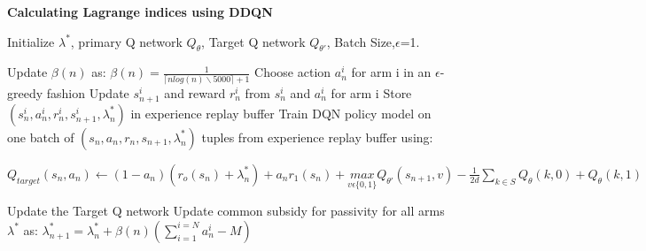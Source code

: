 \documentclass{slides}
\begin{document}
{\newpage
\textbf{Calculating Lagrange indices using DDQN}
\begin{algorithm}[H]
\begin{small}
\begin{algorithmic}[1]
    \State Initialize $\lambda^*$, primary Q network $Q_\theta$, Target Q network $Q_{\theta'}$, Batch Size,$\epsilon$=1.

        
        \State Update $\beta(n)$ as:
        $\beta(n)=\frac{1}{\lceil{nlog(n)\backslash5000}\rceil+1}$
            \State Choose action $a_{n}^i$ for  arm i in an $\epsilon$-greedy fashion
            \State Update $s_{n+1}^i$ and reward $r_n^i$ from $s_{n}^i$ and $a_{n}^i$ for  arm i
            \State Store $(s_{n}^i,a_{n}^i,r_{n}^i,s_{n+1}^i,\lambda_n^*)$ in experience replay buffer
            \State Train DQN policy model on one batch of $(s_{n},a_{n},r_{n},s_{n+1},\lambda_n^*)$ tuples from experience replay buffer using:
            \Statex\begin{small}
            $Q_{target}(s_n,a_n)\gets(1-a_n)(r_o(s_n)+\lambda_n^*)+a_nr_1(s_n)+\underset{v\epsilon\{0,1\}}{max}Q_{\theta'}(s_{n+1},v)-\frac{1}{2d}\sum\limits_{k\in S}Q_{\theta}(k,0)+Q_{\theta}(k,1)$\end{small}
        \EndFor
        \State Update the Target Q network 
        \State Update common subsidy for passivity for all arms $\lambda^*$ as: $\lambda_{n+1}^*=\lambda_n^*+\beta(n)(\sum\limits_{i=1}^{i=N}a_n^i-M)$
        

\end{algorithmic}
\end{small}
\end{algorithm}}
\end{document}
